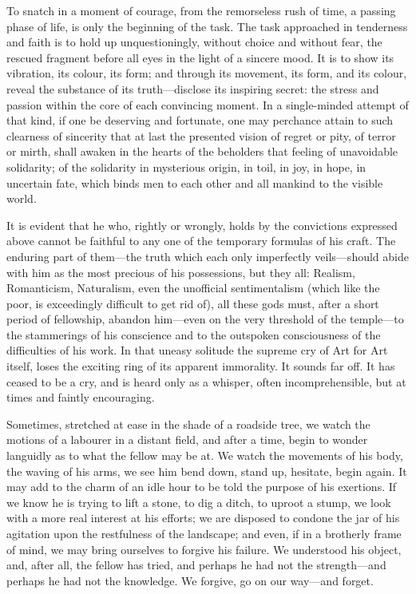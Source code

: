To snatch in a moment of courage, from the remorseless rush of time, a
passing phase of life, is only the beginning of the task. The task
approached in tenderness and faith is to hold up unquestioningly,
without choice and without fear, the rescued fragment before all eyes in
the light of a sincere mood. It is to show its vibration, its colour,
its form; and through its movement, its form, and its colour, reveal the
substance of its truth---disclose its inspiring secret: the stress and
passion within the core of each convincing moment. In a single-minded
attempt of that kind, if one be deserving and fortunate, one may
perchance attain to such clearness of sincerity that at last the
presented vision of regret or pity, of terror or mirth, shall awaken in
the hearts of the beholders that feeling of unavoidable solidarity; of
the solidarity in mysterious origin, in toil, in joy, in hope, in
uncertain fate, which binds men to each other and all mankind to the
visible world.

It is evident that he who, rightly or wrongly, holds by the convictions
expressed above cannot be faithful to any one of the temporary formulas
of his craft. The enduring part of them---the truth which each only
imperfectly veils---should abide with him as the most precious of his
possessions, but they all: Realism, Romanticism, Naturalism, even the
unofficial sentimentalism (which like the poor, is exceedingly difficult
to get rid of), all these gods must, after a short period of fellowship,
abandon him---even on the very threshold of the temple---to the
stammerings of his conscience and to the outspoken consciousness of the
difficulties of his work. In that uneasy solitude the supreme cry of Art
for Art itself, loses the exciting ring of its apparent immorality. It
sounds far off. It has ceased to be a cry, and is heard only as a
whisper, often incomprehensible, but at times and faintly encouraging.

Sometimes, stretched at ease in the shade of a roadside tree, we watch
the motions of a labourer in a distant field, and after a time, begin to
wonder languidly as to what the fellow may be at. We watch the movements
of his body, the waving of his arms, we see him bend down, stand up,
hesitate, begin again. It may add to the charm of an idle hour to be
told the purpose of his exertions. If we know he is trying to lift a
stone, to dig a ditch, to uproot a stump, we look with a more real
interest at his efforts; we are disposed to condone the jar of his
agitation upon the restfulness of the landscape; and even, if in a
brotherly frame of mind, we may bring ourselves to forgive his failure.
We understood his object, and, after all, the fellow has tried, and
perhaps he had not the strength---and perhaps he had not the knowledge.
We forgive, go on our way---and forget.

